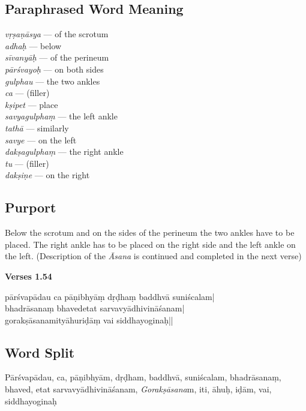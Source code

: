 \subsection*{Paraphrased Word Meaning}

\begin{multicols}{2}
\textit{vṛṣaṇāsya} ---  of the scrotum \\
\textit{adhaḥ} ---  below  \\
\textit{sīvanyāḥ} --- of the perineum   \\
\textit{pārśvayoḥ} ---  on both sides  \\
\textit{gulphau} ---  the two ankles  \\
\textit{ca} ---   (filler) \\
\textit{kṣipet} --- place  \\
\textit{savyagulphaṃ} --- the left ankle  \\
\textit{tathā} ---  similarly \\
\textit{savye} ---  on the left  \\
\textit{dakṣagulphaṃ} ---  the right ankle  \\
\textit{tu} ---  (filler) \\
\textit{dakṣiṇe} --- on the right 
\end{multicols}

\subsection*{Purport}

Below the scrotum and on the sides of the perineum the two ankles have to be placed. The right ankle has to be placed on the right side and the left ankle on the left. (Description of the \textit{Āsana} is continued and completed in the next verse)

\newpage
\noindent \textbf{Verses 1.54}

\begin{shloka}
pārśvapādau ca pāṇibhyāṃ dṛḍhaṃ baddhvā suniścalam|\\
bhadrāsanaṃ bhavedetat sarvavyādhivināśanam|\\
gorakṣāsanamityāhuriḍāṃ vai siddhayoginaḥ||
\end{shloka}

\subsection*{Word Split}

Pārśvapādau, ca, pāṇibhyām, dṛḍham, baddhvā, suniścalam, bhadrā\-sanaṃ, bhaved, etat sarvavyādhivināśanam, \textit{Gorakṣāsana}m, iti, āhuḥ, iḍām, vai, siddhayoginaḥ
\vspace{-10pt}

